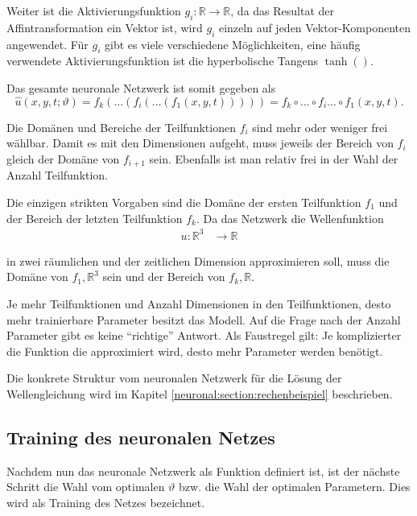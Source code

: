 Weiter ist die Aktivierungsfunktion \( g_i\colon \mathbb{R} \longrightarrow\mathbb{R} \), da das Resultat der Affintransformation ein Vektor ist, wird \( g_i \) einzeln auf jeden Vektor-Komponenten angewendet.
Für \( g_i \) gibt es viele verschiedene Möglichkeiten, eine häufig verwendete Aktivierungsfunktion ist die hyperbolische Tangens \( \tanh() \).

Das gesamte neuronale Netzwerk ist somit gegeben als
\begin{equation}
    \hat{u}(x, y, t; \vartheta) = f_k(\ldots(f_i(\ldots(f_1(x, y, t))))) = f_k \circ \ldots \circ f_i \ldots \circ f_1(x, y, t).
    \label{neuronal:nn_ausformuliert}
\end{equation}

Die Domänen und Bereiche der Teilfunktionen \( f_i \) sind mehr oder weniger frei wählbar.
Damit es mit den Dimensionen aufgeht, muss jeweils der Bereich von \( f_i \) gleich der Domäne von \( f_{i+1} \) sein.
Ebenfalls ist man relativ frei in der Wahl der Anzahl Teilfunktion.

Die einzigen strikten Vorgaben sind die Domäne der ersten Teilfunktion \( f_1 \) und der Bereich der letzten Teilfunktion \( f_k \).
Da das Netzwerk die Wellenfunktion
\begin{align*}
    u\colon \mathbb{R}^3 & \longrightarrow\mathbb{R}
\end{align*}

in zwei räumlichen und der zeitlichen Dimension approximieren soll, muss die Domäne von \( f_1, \mathbb{R}^3\) sein und der Bereich von \( f_k, \mathbb{R}\).

Je mehr Teilfunktionen und Anzahl Dimensionen in den Teilfunktionen, desto mehr trainierbare Parameter besitzt das Modell.
Auf die Frage nach der Anzahl Parameter gibt es keine ``richtige'' Antwort.
Als Faustregel gilt: Je komplizierter die Funktion die approximiert wird, desto mehr Parameter werden benötigt.

Die konkrete Struktur vom neuronalen Netzwerk für die Lösung der Wellengleichung wird im Kapitel \ref{neuronal:section:rechenbeispiel} beschrieben.


\subsection{Training des neuronalen Netzes}\label{neuronal:subsection:training_nn}

Nachdem nun das neuronale Netzwerk als Funktion definiert ist, ist der nächste Schritt die Wahl vom optimalen \( \vartheta \) bzw. die Wahl der optimalen Parametern.
Dies wird als Training des Netzes bezeichnet.

